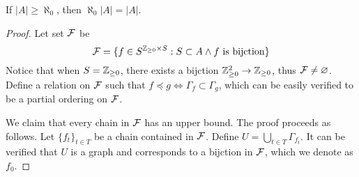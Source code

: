 \begin{proposition}
  \label{proposition 1.3.1}
  If $|A| \geq \aleph_0$, then $\aleph_0 |A| = |A|$.
\end{proposition}
\begin{proof}
  Let set ${\cal F}$ be 
  \begin{equation*}
    {\cal F} = \{ f \in S^{\mathbb Z_{\geq 0} \times S}: S \subset A \land f \ \text{is bijction} \}
  \end{equation*}
  Notice that when $S = \mathbb Z_{\geq 0}$, there exists a bijction $\mathbb Z_{\geq 0}^2 \to \mathbb Z_{\geq 0}$, thus ${\cal F} \neq \varnothing$. Define a relation on ${\cal F}$ such that $f \preccurlyeq g \Leftrightarrow \Gamma_f \subset \Gamma_g$, which can be easily verified to be a partial ordering on ${\cal F}$. 
  
  We claim that every chain in ${\cal F}$ has an upper bound. The proof proceeds as follows. Let $\{f_t\}_{t \in T}$ be a chain contained in ${\cal F}$. Define $U = \bigcup_{t \in T} \Gamma_{f_t}$. It can be verified that $U$ is a graph and corresponds to a bijction in ${\cal F}$, which we denote as $f_0$.


\end{proof}
